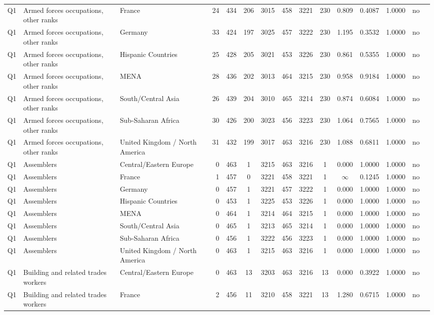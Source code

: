 \begin{longtable}{lllrcccccccccll}
Q1 & Armed forces occupations, other ranks & France & 24 & 434 & 206 & 3015 & 458 & 3221 & 230 & 0.809 & 0.4087 & 1.0000 & no \\
Q1 & Armed forces occupations, other ranks & Germany & 33 & 424 & 197 & 3025 & 457 & 3222 & 230 & 1.195 & 0.3532 & 1.0000 & no \\
Q1 & Armed forces occupations, other ranks & Hispanic Countries & 25 & 428 & 205 & 3021 & 453 & 3226 & 230 & 0.861 & 0.5355 & 1.0000 & no \\
Q1 & Armed forces occupations, other ranks & MENA & 28 & 436 & 202 & 3013 & 464 & 3215 & 230 & 0.958 & 0.9184 & 1.0000 & no \\
Q1 & Armed forces occupations, other ranks & South/Central Asia & 26 & 439 & 204 & 3010 & 465 & 3214 & 230 & 0.874 & 0.6084 & 1.0000 & no \\
Q1 & Armed forces occupations, other ranks & Sub-Saharan Africa & 30 & 426 & 200 & 3023 & 456 & 3223 & 230 & 1.064 & 0.7565 & 1.0000 & no \\
Q1 & Armed forces occupations, other ranks & United Kingdom / North America & 31 & 432 & 199 & 3017 & 463 & 3216 & 230 & 1.088 & 0.6811 & 1.0000 & no \\
Q1 & Assemblers & Central/Eastern Europe & 0 & 463 & 1 & 3215 & 463 & 3216 & 1 & 0.000 & 1.0000 & 1.0000 & no \\
Q1 & Assemblers & France & 1 & 457 & 0 & 3221 & 458 & 3221 & 1 & $\infty$ & 0.1245 & 1.0000 & no \\
Q1 & Assemblers & Germany & 0 & 457 & 1 & 3221 & 457 & 3222 & 1 & 0.000 & 1.0000 & 1.0000 & no \\
Q1 & Assemblers & Hispanic Countries & 0 & 453 & 1 & 3225 & 453 & 3226 & 1 & 0.000 & 1.0000 & 1.0000 & no \\
Q1 & Assemblers & MENA & 0 & 464 & 1 & 3214 & 464 & 3215 & 1 & 0.000 & 1.0000 & 1.0000 & no \\
Q1 & Assemblers & South/Central Asia & 0 & 465 & 1 & 3213 & 465 & 3214 & 1 & 0.000 & 1.0000 & 1.0000 & no \\
Q1 & Assemblers & Sub-Saharan Africa & 0 & 456 & 1 & 3222 & 456 & 3223 & 1 & 0.000 & 1.0000 & 1.0000 & no \\
Q1 & Assemblers & United Kingdom / North America & 0 & 463 & 1 & 3215 & 463 & 3216 & 1 & 0.000 & 1.0000 & 1.0000 & no \\
Q1 & Building and related trades workers & Central/Eastern Europe & 0 & 463 & 13 & 3203 & 463 & 3216 & 13 & 0.000 & 0.3922 & 1.0000 & no \\
Q1 & Building and related trades workers & France & 2 & 456 & 11 & 3210 & 458 & 3221 & 13 & 1.280 & 0.6715 & 1.0000 & no \\

\end{longtable}

